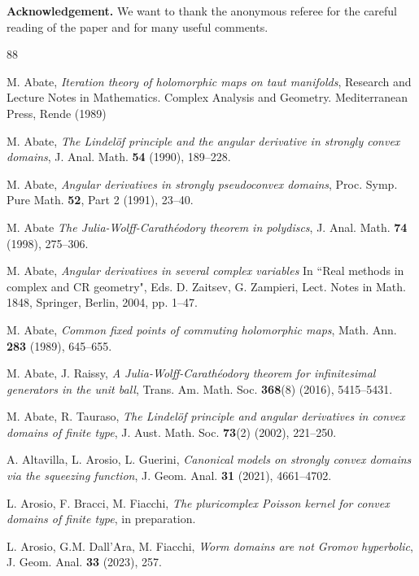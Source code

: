 \documentclass[11pt, reqno]{amsart}
\numberwithin{equation}{section}
\theoremstyle{definition}
\begin{document}
{{{	\textbf{Acknowledgement.} We want to thank the anonymous referee for the careful reading of the paper and for many useful comments.
	
	\begin{thebibliography}{88} 
		
		
		
		 M. Abate, {\sl Iteration theory of holomorphic maps on taut manifolds}, Research and Lecture Notes in Mathematics. Complex Analysis and Geometry. Mediterranean Press, Rende (1989)
		
		 M. Abate, {\sl The Lindel\"of principle and the angular derivative in strongly convex domains}, J. Anal. Math. {\bf 54} (1990), 189--228.
		
		 M. Abate, {\sl Angular derivatives in strongly pseudoconvex domains}, Proc. Symp. Pure Math. {\bf 52}, Part 2 (1991), 23--40.
		
		 M. Abate {\sl The Julia-Wolff-Carath\'eodory theorem in polydiscs}, J. Anal. Math. {\bf 74} (1998), 275--306.
		
		 M. Abate, {\sl Angular derivatives in several complex variables} In ``Real methods in complex and CR geometry", Eds. D. Zaitsev, G. Zampieri, Lect. Notes in Math. 1848, Springer, Berlin, 2004, pp. 1--47.
		
		 M. Abate, {\sl Common fixed points of commuting holomorphic maps}, Math. Ann. {\bf 283} (1989), 645--655.
		
		 M. Abate, J. Raissy, {\sl A Julia-Wolff-Carath\'eodory theorem for infinitesimal generators in the unit ball}, Trans. Am. Math. Soc. {\bf 368}(8) (2016), 5415--5431.
		
		 M. Abate, R. Tauraso, {\sl The Lindel\"of principle and angular derivatives in convex domains of finite type}, J. Aust. Math. Soc. {\bf 73}(2) (2002), 221--250.
		
		 A. Altavilla, L. Arosio, L. Guerini, {\sl Canonical models on strongly convex domains via the squeezing function}, J. Geom. Anal. {\bf 31} (2021), 4661--4702.	
		
		 L. Arosio, F. Bracci, M. Fiacchi, {\sl The pluricomplex Poisson kernel for  convex domains of finite type}, in preparation.
		
		 L. Arosio, G.M. Dall'Ara, M. Fiacchi, {\sl Worm domains are not Gromov hyperbolic}, J. Geom. Anal. {\bf 33} (2023),  257.
		

\end{thebibliography}}}}
\end{document}
